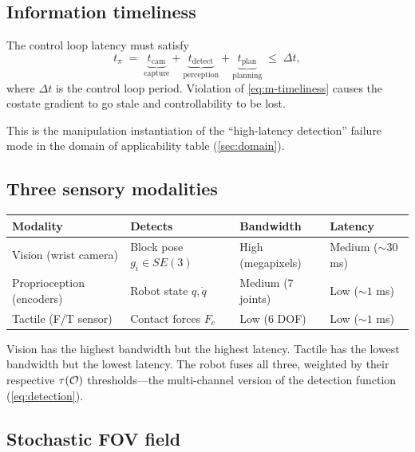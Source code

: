 \subsection{Information timeliness}

\begin{proposition}
\label{prop:m-timeliness}
The control loop latency must satisfy
\begin{equation}\label{eq:m-timeliness}
  t_\pi \;=\; \underbrace{t_\mathrm{cam}}_{\text{capture}}
  + \underbrace{t_\mathrm{detect}}_{\text{perception}}
  + \underbrace{t_\mathrm{plan}}_{\text{planning}}
  \;\leq\; \Delta t,
\end{equation}
where $\Delta t$ is the control loop period.  Violation of
\eqref{eq:m-timeliness} causes the costate gradient to go stale
and controllability to be lost.
\end{proposition}

This is the manipulation instantiation of the ``high-latency
detection'' failure mode in the domain of applicability table
(\cref{sec:domain}).

\subsection{Three sensory modalities}

\begin{center}
\begin{tabular}{@{}llll@{}}
\toprule
\textbf{Modality} & \textbf{Detects} & \textbf{Bandwidth}
  & \textbf{Latency} \\
\midrule
Vision (wrist camera) & Block pose $g_i \in SE(3)$
  & High (megapixels) & Medium (${\sim}30$ ms) \\
Proprioception (encoders) & Robot state $q, \dot{q}$
  & Medium (7 joints) & Low (${\sim}1$ ms) \\
Tactile (F/T sensor) & Contact forces $F_c$
  & Low (6 DOF) & Low (${\sim}1$ ms) \\
\bottomrule
\end{tabular}
\end{center}

Vision has the highest bandwidth but the highest latency.
Tactile has the lowest bandwidth but the lowest latency.  The robot
fuses all three, weighted by their respective
$\tau(\mathcal{O})$ thresholds---the multi-channel version of the
detection function (\cref{eq:detection}).

\subsection{Stochastic FOV field}
\label{sec:m-stochastic-fov}

